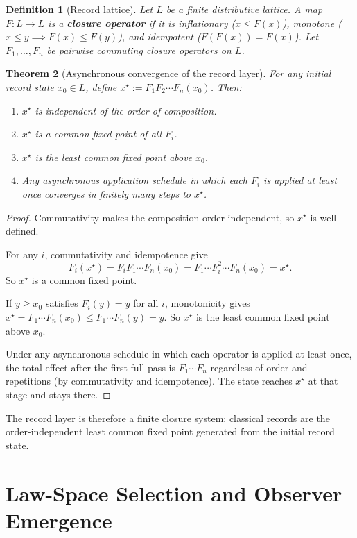 \documentclass[11pt]{article}
\newtheorem{theorem}{Theorem}[section]
\newtheorem{definition}[theorem]{Definition}
\theoremstyle{remark}
\theoremstyle{plain}
\begin{document}
\begin{definition}[Record lattice]\label{def:lattice}
Let $L$ be a finite distributive lattice. A map $F:L\to L$ is a \textbf{closure operator} if it is inflationary ($x\le F(x)$), monotone ($x\le y\implies F(x)\le F(y)$), and idempotent ($F(F(x))=F(x)$). Let $F_1,\dots,F_n$ be pairwise commuting closure operators on $L$.
\end{definition}

\begin{theorem}[Asynchronous convergence of the record layer]\label{thm:crdt}
For any initial record state $x_0\in L$, define $x^\star := F_1 F_2\cdots F_n(x_0)$. Then:
\begin{enumerate}
\item $x^\star$ is independent of the order of composition.
\item $x^\star$ is a common fixed point of all $F_i$.
\item $x^\star$ is the least common fixed point above $x_0$.
\item Any asynchronous application schedule in which each $F_i$ is applied at least once converges in finitely many steps to $x^\star$.
\end{enumerate}
\end{theorem}

\begin{proof}
Commutativity makes the composition order-independent, so $x^\star$ is well-defined.

For any $i$, commutativity and idempotence give
\[
F_i(x^\star)
=
F_i F_1\cdots F_n(x_0)
=
F_1\cdots F_i^2\cdots F_n(x_0)
=
x^\star.
\]
So $x^\star$ is a common fixed point.

If $y\ge x_0$ satisfies $F_i(y)=y$ for all $i$, monotonicity gives $x^\star = F_1\cdots F_n(x_0) \le F_1\cdots F_n(y) = y$. So $x^\star$ is the least common fixed point above $x_0$.

Under any asynchronous schedule in which each operator is applied at least once, the total effect after the first full pass is $F_1\cdots F_n$ regardless of order and repetitions (by commutativity and idempotence). The state reaches $x^\star$ at that stage and stays there.
\end{proof}

The record layer is therefore a finite closure system: classical records are the order-independent
least common fixed point generated from the initial record state.


\section{Law-Space Selection and Observer Emergence}
\end{document}
